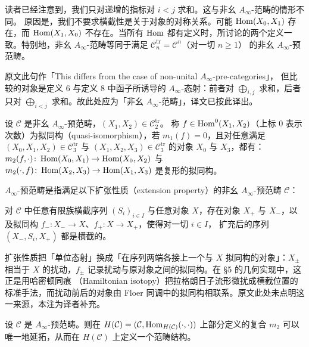 读者已经注意到，我们只对递增的指标对 $i<j$ 求和。这与非幺 $A_\infty$-范畴的情形不同。
原因是，我们不要求横截性是关于对象的对称关系。可能 $\operatorname{Hom}(X_0,X_1)$ 存在，而
$\operatorname{Hom}(X_1,X_0)$ 不存在。当所有 $\operatorname{Hom}$ 都有定义时，所讨论的两个定义一致。特别地，非幺
$A_\infty$-范畴等同于满足 $\mathcal{C}^{\mathrm{tr}}_n=\mathcal{C}^n$（对一切 $n\ge1$）
的非幺 $A_\infty$-预范畴。

\begin{yizhu}[原文的一处笔误]
原文此句作「This differs from the case of non-unital $A_\infty$-pre-categories」，
但比较的对象是定义 6 与定义 8 中函子所诱导的 $A_\infty$-态射：前者对 $\bigoplus_{i,j}$
求和，后者只对 $\bigoplus_{i<j}$ 求和。故此处应为「非幺 $A_\infty$-范畴」，译文已按此译出。
\end{yizhu}

\begin{dfn}
设 $\mathcal{C}$ 是非幺 $A_\infty$-预范畴，$(X_1,X_2)\in\mathcal{C}^{\mathrm{tr}}_2$。
称 $f\in\operatorname{Hom}^0(X_1,X_2)$（上标 $0$ 表示次数）为拟同构（quasi-isomorphism），若
$m_1(f)=0$，且对任意满足 $(X_0,X_1,X_2)\in\mathcal{C}^{\mathrm{tr}}_3$ 与
$(X_1,X_2,X_3)\in\mathcal{C}^{\mathrm{tr}}_3$ 的对象 $X_0$ 与 $X_3$，都有：
$m_2(f,\cdot)\colon\operatorname{Hom}(X_0,X_1)\to\operatorname{Hom}(X_0,X_2)$ 与
$m_2(\cdot,f)\colon\operatorname{Hom}(X_2,X_3)\to\operatorname{Hom}(X_1,X_3)$ 是复形的拟同构。
\end{dfn}

\begin{dfn}
$A_\infty$-预范畴是指满足以下扩张性质（extension property）的非幺 $A_\infty$-预范畴
$\mathcal{C}$：

对 $\mathcal{C}$ 中任意有限族横截序列 $(S_i)_{i\in I}$ 与任意对象 $X$，存在对象 $X_+$
与 $X_-$，以及拟同构 $f_-\colon X_-\to X$、$f_+\colon X\to X_+$，使得对一切 $i\in I$，
扩充后的序列 $(X_-,S_i,X_+)$ 都是横截的。
\end{dfn}

\begin{yizhu}
扩张性质把「单位态射」换成「在序列两端各接上一个与 $X$ 拟同构的对象」：$X_\pm$ 相当于
$X$ 的扰动，$f_\pm$ 记录扰动与原对象之间的拟同构。在 §5 的几何实现中，这正是用哈密顿同痕
（Hamiltonian isotopy）把拉格朗日子流形微扰成横截位置的标准手法，而扰动前后的对象由
Floer 同调中的拟同构相联系。原文此处未点明这一来源，本注为译者补充。
\end{yizhu}

\begin{rmk}
设 $\mathcal{C}$ 是 $A_\infty$-预范畴。则在
$H(\mathcal{C})=(\mathcal{C},\operatorname{Hom}_{H(\mathcal{C})}(\cdot,\cdot))$ 上部分定义的复合
$m_2$ 可以唯一地延拓，从而在 $H(\mathcal{C})$ 上定义一个范畴结构。
\end{rmk}

